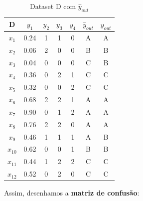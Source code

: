 \documentclass{article}
\begin{document}
\begin{table}[h!]
\centering
\begin{tabular}{|c|c|c|c|c|c|c|}
\hline
    D     & $y_1$ & $y_2$ & $y_3$ & $y_4$ & $\hat{y}_{out}$ & $y_{out}$ \\ \hline
    $x_1$ & 0.24   & 1     & 1     & 0     & A         & A         \\ \hline
    $x_2$ & 0.06   & 2     & 0     & 0     & B         & B         \\ \hline
    $x_3$ & 0.04   & 0     & 0     & 0     & C         & B         \\ \hline
    $x_4$ & 0.36   & 0     & 2     & 1     & C         & C         \\ \hline
    $x_5$ & 0.32   & 0     & 0     & 2     & C         & C         \\ \hline
    $x_6$ & 0.68   & 2     & 2     & 1     & A         & A         \\ \hline
    $x_7$ & 0.90   & 0     & 1     & 2     & A         & A         \\ \hline
    $x_8$ & 0.76   & 2     & 2     & 0     & A         & A         \\ \hline
    $x_9$ & 0.46   & 1     & 1     & 1     & A         & B         \\ \hline
  $x_{10}$ & 0.62   & 0     & 0     & 1     & B         & B         \\ \hline
  $x_{11}$ & 0.44   & 1     & 2     & 2     & C         & C         \\ \hline
  $x_{12}$ & 0.52   & 0     & 2     & 0     & C         & C         \\ \hline
\end{tabular}
\caption{Dataset D com $\hat{y}_{out}$}
\label{tab:datasetD_comprev}
\end{table}

Assim, desenhamos a \textbf{matriz de confusão}:
\end{document}
